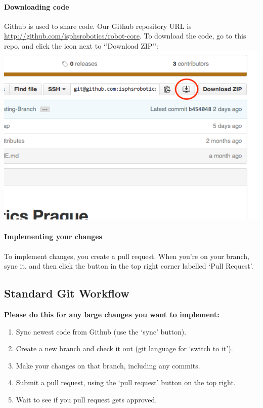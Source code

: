 \documentclass[12p,a4paper]{article}
\begin{document}
\paragraph{Downloading code}Github is used to share code. Our Github repository URL is \url{http://github.com/isphsrobotics/robot-core}. To download the code, go to this repo, and click the icon next to `'Download ZIP'':\\
\includegraphics[scale=0.6]{download-repo}
\paragraph{Implementing your changes}To implement changes, you create a pull request. When you're on your branch, sync it, and then click the button in the top right corner labelled `Pull Request'.

\subsection{Standard Git Workflow}
\textbf{Please do this for any large changes you want to implement:}

\begin{enumerate}
\item{Sync newest code from Github (use the `sync' button).}
\item{Create a new branch and check it out (git language for `switch to it').}
\item{Make your changes on that branch, including any commits.}
\item{Submit a pull request, using the `pull request' button on the top right.}
\item{Wait to see if you pull request gets approved.}
\end{enumerate}
\end{document}
